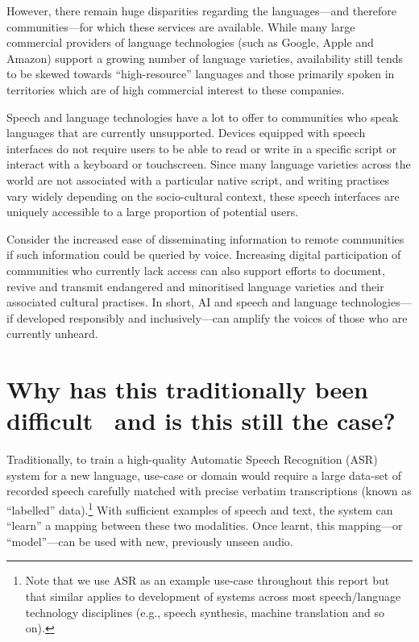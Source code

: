 \documentclass[10pt,twoside,openright]{report}
\begin{document}
However, there remain huge disparities regarding the languages---and therefore communities---for which these services are available.
While many large commercial providers of language technologies (such as Google, Apple and Amazon) support a growing number of language varieties, availability still tends to be skewed towards ``high-resource'' languages and those primarily spoken in territories which are of high commercial interest to these companies. 

Speech and language technologies have a lot to offer to communities who speak languages that are currently unsupported.
Devices equipped with speech interfaces do not require users to be able to read or write in a specific script or interact with a keyboard or touchscreen.
Since many language varieties across the world are not associated with a particular native script, and writing practises vary widely depending on the socio-cultural context, these speech interfaces are uniquely accessible to a large proportion of potential users. 

Consider the increased ease of disseminating information to remote communities if such information could be queried by voice.
Increasing digital participation of communities who currently lack access can also support efforts to document, revive and transmit endangered and minoritised language varieties and their associated cultural practises.
In short, AI and speech and language technologies---if developed responsibly and inclusively---can amplify the voices of those who are currently unheard.


\section{Why has this traditionally been difficult~\texorpdfstring{\raisebox{3pt}{\rule{8pt}{1.5pt}}}{--} and is this still the case?}
Traditionally, to train a high-quality Automatic Speech Recognition (ASR) system for a new language, use-case or domain would require a large data-set of recorded speech carefully matched with precise verbatim transcriptions (known as ``labelled'' data).\footnote{Note that we use ASR as an example use-case throughout this report but that similar applies to development of systems across most speech/language technology disciplines (e.g., speech synthesis, machine translation and so on).}
With sufficient examples of speech and text, the system can ``learn'' a mapping between these two modalities.
Once learnt, this mapping---or ``model''---can be used with new, previously unseen audio.
\end{document}
